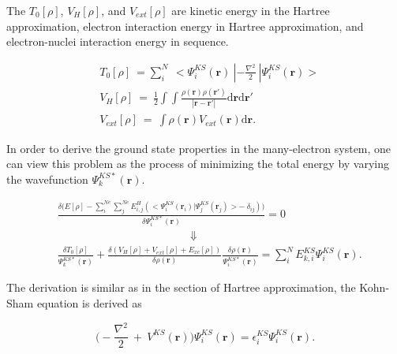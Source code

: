 \documentclass[a4paper, 12pt, titlepage,oneside,drop]{kthesis}
\begin{document}
The $T_{0}[\rho]$, $V_{H}[\rho]$, and $V_{ext}[\rho]$ are kinetic energy in the Hartree approximation, electron interaction energy in Hartree approximation, and electron-nuclei interaction energy in sequence.

\begin{equation}\begin{split}\label{kankan}
& T_{0}[\rho]\ = \sum\limits_i^{N} \ < \Psi_{i}^{{KS}}(\textbf{r}) \ | -\frac{\nabla^{2}}{2} \ | \Psi_{i}^{{KS}}(\textbf{r}) > \\
& V_{H}[\rho] \ = \ \frac{1}{2} \int \int  \frac{\rho({\textbf{r}})\rho(\textbf{r}')}{|{\textbf{r}}-{\textbf{r}}'|} \mathrm{d} {\textbf{r}} \mathrm{d}{\textbf{r}'}\\
& V_{ext}[\rho]\ = \ \int  \rho(\textbf{r}) V_{ext}(\textbf{r})\mathrm{d}{\textbf{r}}. 
\end{split}
\end{equation}

In order to derive the ground state properties in the many-electron system, one can view this problem as the process of minimizing the total energy by varying the wavefunction $\Psi^{{KS}*}_{{k}}(\textbf{r})$. 

\begin{equation}\begin{split}\label{ks11}
& \frac{ \delta  \Big(E[\rho] - \sum\limits_{i}^{Ne} \sum\limits_{j}^{Ne} E_{i,j}^{H} (<\Psi^{{KS}}_{{i}}(\textbf{r}_i) | \Psi^{{KS}}_{{j}}(\textbf{r}_j)> -\ \delta_{ij})\Big)}{\delta \Psi^{{KS}*}_{{i}}(\textbf{r})}  = 0 \\
&  \qquad \qquad \qquad  \qquad \qquad \qquad  \Downarrow \\
& \frac{\delta T_{0}[\rho]}{\Psi^{{KS}*}_{{k}}(\textbf{r})} + \frac{\delta(V_{H}[\rho]  + V_{ext}[\rho] + E_{xc}[\rho])}{\delta \rho(\textbf{r})} \frac{\delta \rho(\textbf{r})}{\Psi^{{KS}*}_{{i}}(\textbf{r})} 
= \sum\limits_i^{{N}} E_{k,i}^{KS} \Psi^{{KS}}_{{i}}(\textbf{r}).
\end{split}
\end{equation}


The derivation is similar as in the section of Hartree approximation, the Kohn-Sham equation is derived as 

\begin{equation}\label{aaa}
 \Big(-\frac{\nabla^{2}}{2}\ + \ V^{KS}(\textbf{r})\Big) \Psi^{{KS}}_{{i}}(\textbf{r}) = \epsilon^{{KS}}_{{i}} \Psi^{{KS}}_{{i}}(\textbf{r}).
\end{equation}
\end{document}
